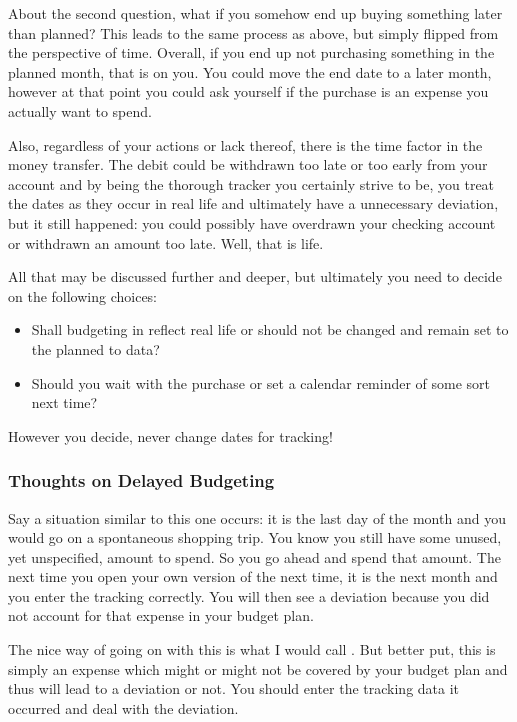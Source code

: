 About the second question, what if you somehow end up buying something later than planned?
This leads to the same process as above, but simply flipped from the perspective of time.
Overall, if you end up not purchasing something in the planned month, that is on you.
You could move the end date to a later month, however at that point you could ask yourself if the purchase is an expense you actually want to spend.

Also, regardless of your actions or lack thereof, there is the time factor in the money transfer.
The debit could be withdrawn too late or too early from your account and by being the thorough tracker you certainly strive to be, you treat the dates as they occur in real life and ultimately have a unnecessary deviation, but it still happened: you could possibly have overdrawn your checking account or withdrawn an amount too late.
Well, that is life.

All that may be discussed further and deeper, but ultimately you need to decide on the following choices:
\begin{itemize}
	\item Shall budgeting in \tfn reflect real life or should \tfn not be changed and remain set to the planned to data?
	\item Should you wait with the purchase or set a calendar reminder of some sort next time?
\end{itemize}
\begin{specialnote}
	However you decide, never change dates for tracking!
\end{specialnote}

\subsubsection{Thoughts on Delayed Budgeting}
\label{subsubsec:thoughts-delayed-budgeting}

Say a situation similar to this one occurs:
it is the last day of the month and you would go on a spontaneous shopping trip.
You know you still have some unused, yet unspecified, amount to spend.
So you go ahead and spend that amount.
The next time you open your own version of \tfn the next time, it is the next month and you enter the tracking correctly.
You will then see a deviation because you did not account for that expense in your budget plan.

The nice way of going on with this is what I would call .
But better put, this is simply an expense which might or might not be covered by your budget plan and thus will lead to a deviation or not.
You should enter the tracking data it occurred and deal with the deviation.

